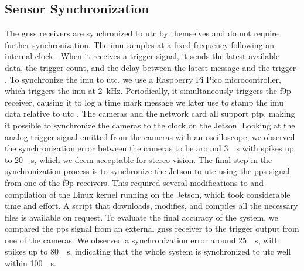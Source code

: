 \subsection{Sensor Synchronization}
The \gls{gnss} receivers are synchronized to \gls{utc} by themselves and do not require further synchronization.
The \gls{imu} samples at a fixed frequency following an internal clock \cite{safranSTIM300Datasheet}.
When it receives a trigger signal, it sends the latest available data, the trigger count, and the delay between the latest message and the trigger \cite{safranSTIM300Datasheet}.
To synchronize the \gls{imu} to \gls{utc}, we use a Raspberry Pi Pico microcontroller, which triggers the \gls{imu} at \SI{2}{kHz}.
Periodically, it simultaneously triggers the \gls{f9p} receiver, causing it to log a time mark message we later use to stamp the \gls{imu} data relative to \gls{utc} \cite[190]{u-bloxZEDF9PInterfaceDescription}.
The cameras and the network card all support \gls{ptp}, making it possible to synchronize the cameras to the clock on the Jetson.
Looking at the analog trigger signal emitted from the cameras with an oscilloscope, we observed the synchronization error between the cameras to be around \SI{3}{\mu s} with spikes up to \SI{20}{\mu s}, which we deem acceptable for stereo vision.
The final step in the synchronization process is to synchronize the Jetson to \gls{utc} using the \gls{pps} signal from one of the \gls{f9p} receivers.
This required several modifications to and compilation of the Linux kernel running on the Jetson, which took considerable time and effort.
A script that downloads, modifies, and compiles all the necessary files is available on request.
To evaluate the final accuracy of the system, we compared the \gls{pps} signal from an external \gls{gnss} receiver to the trigger output from one of the cameras. 
We observed a synchronization error around \SI{25}{\mu s}, with spikes up to \SI{80}{\mu s}, indicating that the whole system is synchronized to \gls{utc} well within \SI{100}{\mu s}.







